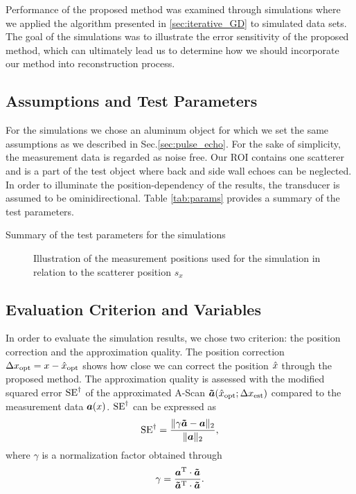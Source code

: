 Performance of the proposed method was examined through simulations where we applied the algorithm presented in \ref{sec:iterative_GD} to simulated data sets. The goal of the simulations was to illustrate the error sensitivity of the proposed method, which can ultimately lead us to determine how we should incorporate our method into reconstruction process.

\subsection{Assumptions and Test Parameters} 
For the simulations we chose an aluminum object for which we set the same assumptions as we described in Sec.\ref{sec:pulse_echo}. For the sake of simplicity, the measurement data is regarded as noise free. Our ROI contains one scatterer and is a part of the test object where back and side wall echoes can be neglected. In order to illuminate the position-dependency of the results, the transducer is assumed to be ominidirectional. Table \ref{tab:params}  provides a summary of the test parameters.

\begin{table}
\begin{center}

\caption{Summary of the test parameters for the simulations}
\label{tab:params}
\end{center}
\end{table}

\begin{figure}
\centering
{}
\caption{Illustration of the measurement positions used for the simulation  in relation to the scatterer position $s_{x}$}
\label{fig:GD_positions}
\setlength{\belowcaptionskip}{-10pt} %
\end{figure}

\subsection{Evaluation Criterion and Variables}
In order to evaluate the simulation results, we chose two criterion: the position correction and the approximation quality. The position correction $\Delta x_{\operatorname{opt}} = x - \hat{x}_{\operatorname{opt}}$ shows how close we can correct the position $\hat{x}$ through the proposed method. The approximation quality is assessed with the modified squared error $\operatorname{SE}^{\dagger}$ of the approximated A-Scan $\bm{\tilde{a}} (\hat{x}_{\operatorname{opt}}; \Delta x_{\operatorname{est}})$ compared to the measurement data $\bm{a} (x)$. $\operatorname{SE}^{\dagger}$ can be expressed as
\begin{equation}
\operatorname{SE}^{\dagger} = \frac{ \| \gamma \bm{\tilde{a}} - \bm{a} \|_{2}}{\| \bm{a} \|_{2}}, 
\end{equation}
where $\gamma$ is a normalization factor obtained through
\begin{equation}
\gamma = \frac{\bm{a}^{\operatorname{T}} \cdot \bm{\tilde{a}}}{\bm{\tilde{a}}^{\operatorname{T}} \cdot \bm{\tilde{a}}}.
\end{equation} \par

